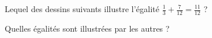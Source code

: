 
\begin{exercice}\label{exosmath-0844}

    Lequel des dessins suivants illustre l'égalité \( \frac{ 1 }{ 3 }+\frac{ 7 }{ 12 }=\frac{ 11 }{ 12 }\) ?
\begin{center}
   
   
   
\end{center}
Quelles égalités sont illustrées par les autres ?

\end{exercice}
